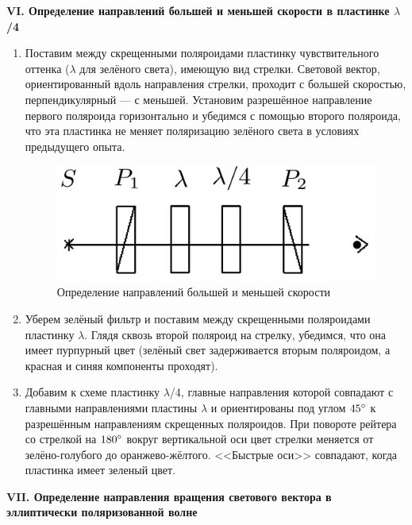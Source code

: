 \documentclass[12pt,a4paper]{article}
\begin{document}
	\begin{center}
		\textbf{VI. Определение направлений большей и меньшей скорости в пластинке $\lambda$/4}
	\end{center}

	\begin{enumerate}
		\item Поставим между скрещенными поляроидами пластинку чувствительного оттенка ($\lambda$ для зелёного света), имеющую вид стрелки. Световой вектор, ориентированный вдоль направления стрелки, проходит с большей скоростью, перпендикулярный — с меньшей. Установим разрешённое направление первого поляроида горизонтально и убедимся с помощью второго поляроида, что эта пластинка не меняет поляризацию зелёного света в условиях предыдущего опыта.
		
		\begin{figure}[h!]
			\centering
			\includegraphics[scale=0.5]{res/VI}
			\caption{Определение направлений большей и меньшей скорости}
		\end{figure}
		
		\item Уберем зелёный фильтр и поставим между скрещенными поляроидами пластинку $\lambda$. Глядя сквозь второй поляроид на стрелку, убедимся, что она имеет пурпурный цвет (зелёный свет задерживается вторым поляроидом, а красная и синяя компоненты проходят).
		
		\item Добавим к схеме пластинку $\lambda$/4, главные направления которой совпадают с главными направлениями пластины $\lambda$ и ориентированы под углом $45\degree$ к разрешённым направлениям скрещенных поляроидов. При повороте рейтера со стрелкой на $180\degree$ вокруг вертикальной оси цвет стрелки меняется от зелёно-голубого до оранжево-жёлтого. <<Быстрые оси>> совпадают, когда пластинка имеет зеленый цвет.
	\end{enumerate}

	
	\begin{center}
		\textbf{VII. Определение направления вращения светового вектора в эллиптически поляризованной волне}
	\end{center}
\end{document}

